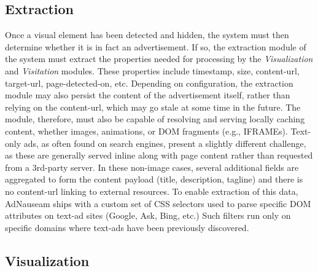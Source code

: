 \documentclass[conference]{IEEEtran}
\begin{document}
\subsection{Extraction}

Once a visual element has been detected and hidden, the system must then determine whether it is in fact an advertisement. If so, the extraction module of the system must extract the properties needed for processing by the \emph{Visualization} and \emph{Visitation} modules. These properties include timestamp, size, content-url, target-url, page-detected-on, etc. Depending on configuration, the extraction module may also persist the content of the advertisement itself, rather than relying on the content-url, which may go stale at some time in the future. The module, therefore, must also be capable of resolving and serving locally caching content, whether images, animations, or DOM fragments (e.g., IFRAMEs). Text-only ads, as often found on search engines, present a slightly different challenge, as these are generally served inline along with page content rather than requested from a 3rd-party server. In these non-image cases, several additional fields are aggregated to form the content payload (title, description, tagline) and there is no content-url linking to external resources. To enable extraction of this data, AdNauseam ships with a custom set of CSS selectors used to parse specific DOM attributes on text-ad sites (Google, Ask, Bing, etc.) Such filters run only on specific domains where text-ads have been previously discovered.

\subsection{Visualization}
\end{document}
